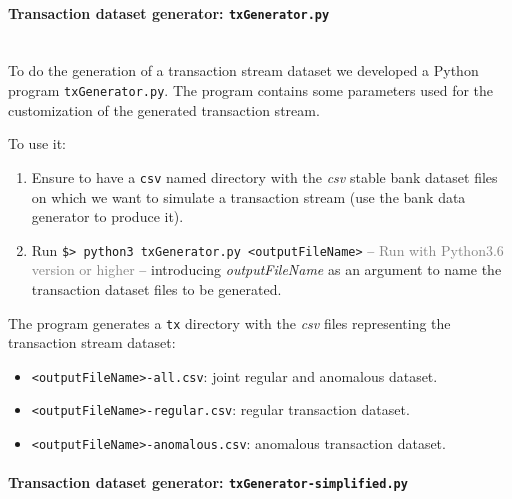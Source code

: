 \paragraph{Transaction dataset generator: \texttt{txGenerator.py} \\\\}

To do the generation of a transaction stream dataset we developed a Python program \texttt{txGenerator.py}. The program contains some parameters used for the customization of the generated transaction stream. 

To use it:

\begin{enumerate}
    \item Ensure to have a \texttt{csv} named directory with the \emph{csv} stable bank dataset files on which we want to simulate a transaction stream (use the bank data generator to produce it).
    \item Run \texttt{\$> python3 txGenerator.py <outputFileName>} -- \textcolor{gray}{Run with Python3.6 version or higher} -- introducing \emph{outputFileName} as an argument to name the transaction dataset files to be generated.
\end{enumerate}

The program generates a \texttt{tx} directory with the \emph{csv} files representing the transaction stream dataset:

\begin{itemize}
    \item \texttt{<outputFileName>-all.csv}: joint regular and anomalous dataset.
    \item \texttt{<outputFileName>-regular.csv}: regular transaction dataset.
    \item \texttt{<outputFileName>-anomalous.csv}: anomalous transaction dataset.
\end{itemize}


\paragraph{Transaction dataset generator: \texttt{txGenerator-simplified.py} \\\\}


